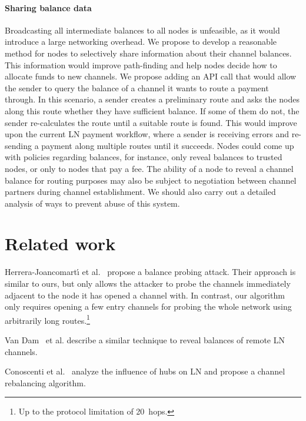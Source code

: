 \paragraph{Sharing balance data}
Broadcasting all intermediate balances to all nodes is unfeasible, as it would introduce a large networking overhead.
We propose to develop a reasonable method for nodes to selectively share information about their channel balances.
This information would improve path-finding and help nodes decide how to allocate funds to new channels.
We propose adding an API call that would allow the sender to query the balance of a channel it wants to route a payment through.
In this scenario, a sender creates a preliminary route and asks the nodes along this route whether they have sufficient balance.
If some of them do not, the sender re-calculates the route until a suitable route is found.
This would improve upon the current LN payment workflow, where a sender is receiving errors and re-sending a payment along multiple routes until it succeeds.
Nodes could come up with policies regarding balances, for instance, only reveal balances to trusted nodes, or only to nodes that pay a fee.
The ability of a node to reveal a channel balance for routing purposes may also be subject to negotiation between channel partners during channel establishment.
We should also carry out a detailed analysis of ways to prevent abuse of this system.


\section{Related work} \label{sec:related-work}
Herrera{-}Joancomart{\'{\i}} et al.~\cite{HerreraJoancomarti2019} propose a balance probing attack.
Their approach is similar to ours, but only allows the attacker to probe the channels immediately adjacent to the node it has opened a channel with.
In contrast, our algorithm only requires opening a few entry channels for probing the whole network using arbitrarily long routes.\footnote{Up to the protocol limitation of 20~hops.}

Van Dam~\cite{Dam2019} et al. describe a similar technique to reveal balances of remote LN channels.

Conoscenti et al.~\cite{Conoscenti2019} analyze the influence of hubs on LN and propose a channel rebalancing algorithm.

